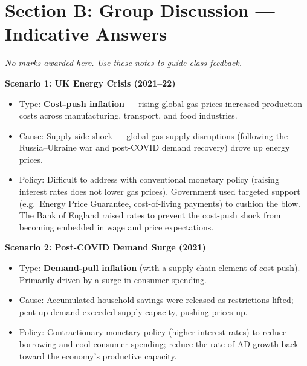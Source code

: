 \documentclass[12pt,a4paper]{article}
\begin{document}
\newpage

\section*{Section B: Group Discussion --- Indicative Answers}

\textit{No marks awarded here. Use these notes to guide class feedback.}

\vspace{0.5em}

\textbf{Scenario 1: UK Energy Crisis (2021--22)}
\begin{itemize}
    \item Type: \textbf{Cost-push inflation} --- rising global gas prices increased production costs across manufacturing, transport, and food industries.
    \item Cause: Supply-side shock --- global gas supply disruptions (following the Russia--Ukraine war and post-COVID demand recovery) drove up energy prices.
    \item Policy: Difficult to address with conventional monetary policy (raising interest rates does not lower gas prices). Government used targeted support (e.g.\ Energy Price Guarantee, cost-of-living payments) to cushion the blow. The Bank of England raised rates to prevent the cost-push shock from becoming embedded in wage and price expectations.
\end{itemize}

\vspace{0.5em}

\textbf{Scenario 2: Post-COVID Demand Surge (2021)}
\begin{itemize}
    \item Type: \textbf{Demand-pull inflation} (with a supply-chain element of cost-push). Primarily driven by a surge in consumer spending.
    \item Cause: Accumulated household savings were released as restrictions lifted; pent-up demand exceeded supply capacity, pushing prices up.
    \item Policy: Contractionary monetary policy (higher interest rates) to reduce borrowing and cool consumer spending; reduce the rate of AD growth back toward the economy's productive capacity.
\end{itemize}

\vspace{0.5em}
\end{document}
